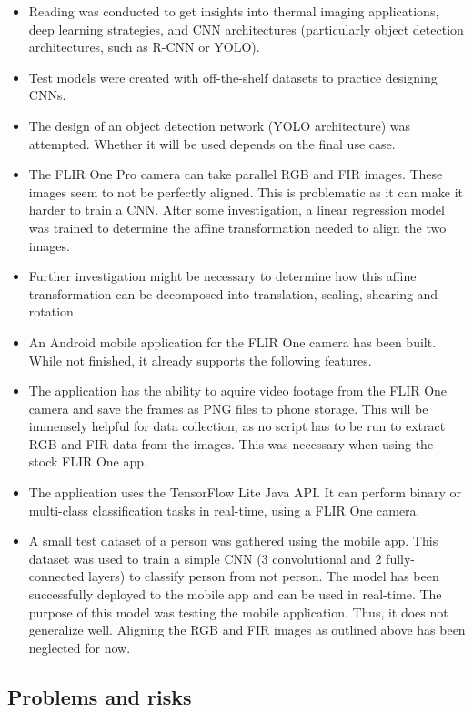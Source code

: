 \documentclass[11pt]{article}
\begin{document}
\begin{itemize}
    \item Reading was conducted to get insights into thermal imaging applications, deep learning strategies, and CNN architectures (particularly object detection architectures, such as R-CNN or YOLO).
    \item Test models were created with off-the-shelf datasets to practice designing CNNs.
    \item The design of an object detection network (YOLO architecture) was attempted. Whether it will be used depends on the final use case.
    \item The FLIR One Pro camera can take parallel RGB and FIR images. These images seem to not be perfectly aligned. This is problematic as it can make it harder to train a CNN. After some investigation, a linear regression model was trained to determine the affine transformation needed to align the two images.
    \item Further investigation might be necessary to determine how this affine transformation can be decomposed into translation, scaling, shearing and rotation.
    \item An Android mobile application for the FLIR One camera has been built. While not finished, it already supports the following features.
    \item The application has the ability to aquire video footage from the FLIR One camera and save the frames as PNG files to phone storage. This will be immensely helpful for data collection, as no script has to be run to extract RGB and FIR data from the images. This was necessary when using the stock FLIR One app.
    \item The application uses the TensorFlow Lite Java API. It can perform binary or multi-class classification tasks in real-time, using a FLIR One camera.
    \item A small test dataset of a person was gathered using the mobile app. This dataset was used to train a simple CNN (3 convolutional and 2 fully-connected layers) to classify person from not person. The model has been successfully deployed to the mobile app and can be used in real-time. The purpose of this model was testing the mobile application. Thus, it does not generalize well. Aligning the RGB and FIR images as outlined above has been neglected for now.
\end{itemize}

\subsection{Problems and risks}\label{problems-and-risks}
\end{document}
